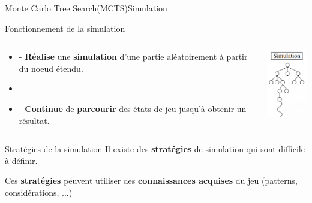 \begin{frame}{Monte Carlo Tree Search(MCTS)}{Simulation}
	\begin{block}{Fonctionnement de la simulation}
		\begin{columns}
			\begin{column}{7cm}
				\begin{itemize}
					\item - \textbf{Réalise} une \textbf{simulation} d'une partie aléatoirement à partir du noeud étendu.
					\item \
					\item - \textbf{Continue} de \textbf{parcourir} des états de jeu jusqu'à obtenir un résultat.

				\end{itemize}
			\end{column}
			\begin{column}{3cm}
				\includegraphics[width=2.2cm]{ressources/MCTS/Simulation.png}
			\end{column}
		\end{columns}
	\end{block}
	\begin{block}{Stratégies de la simulation}
		Il existe des \textbf{stratégies} de simulation qui sont difficile à définir.
		
		Ces \textbf{stratégies} peuvent utiliser des \textbf{connaissances acquises} du jeu (patterns, considérations, ...)
	\end{block}
\end{frame}

